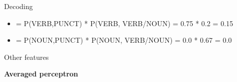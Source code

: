 \documentclass{beamer}
\begin{document}
\begin{frame}{Decoding}
\begin{center}
\begin{onlyenv}

{\small
\begin{itemize}
  \item = P(VERB,PUNCT) * P(VERB, VERB/NOUN) = 0.75 * 0.2 = 0.15
  \item = P(NOUN,PUNCT) * P(NOUN, VERB/NOUN) = 0.0 * 0.67 = 0.0
\end{itemize}
}

\end{onlyenv}


\end{center}



\end{frame}

\begin{frame}{Other features}

\end{frame}




\begin{frame}
\centering
{\LARGE {\bf Averaged perceptron} }
\end{frame}
\end{document}
